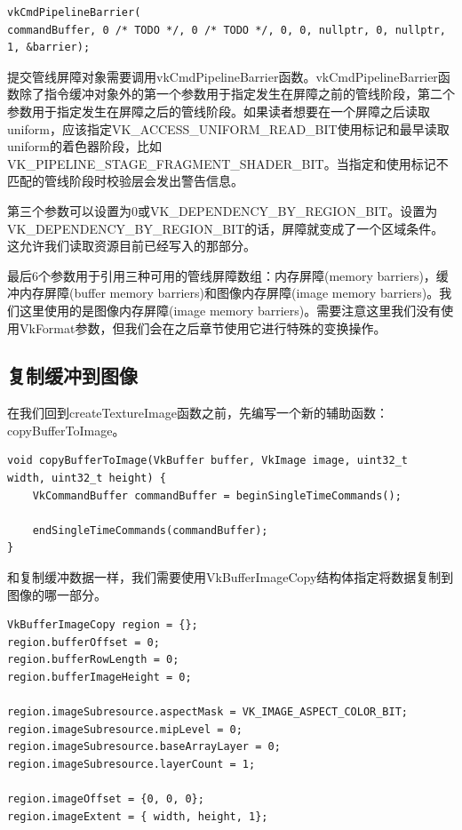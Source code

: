 \documentclass{ctexart}
\begin{document}
\begin{lstlisting}[language={[ANSI]C}]
vkCmdPipelineBarrier(
commandBuffer, 0 /* TODO */, 0 /* TODO */, 0, 0, nullptr, 0, nullptr, 1, &barrier);
\end{lstlisting}

提交管线屏障对象需要调用vkCmdPipelineBarrier函数。vkCmdPipelineBarrier函数除了指令缓冲对象外的第一个参数用于指定发生在屏障之前的管线阶段，第二个参数用于指定发生在屏障之后的管线阶段。如果读者想要在一个屏障之后读取uniform，应该指定VK\_ACCESS\_UNIFORM\_READ\_BIT使用标记和最早读取uniform的着色器阶段，比如VK\_PIPELINE\_STAGE\_FRAGMENT\_SHADER\_BIT。当指定和使用标记不匹配的管线阶段时校验层会发出警告信息。

第三个参数可以设置为0或VK\_DEPENDENCY\_BY\_REGION\_BIT。设置为VK\_DEPENDENCY\_BY\_REGION\_BIT的话，屏障就变成了一个区域条件。这允许我们读取资源目前已经写入的那部分。

最后6个参数用于引用三种可用的管线屏障数组：内存屏障(memory barriers)，缓冲内存屏障(buffer memory barriers)和图像内存屏障(image memory barriers)。我们这里使用的是图像内存屏障(image memory barriers)。需要注意这里我们没有使用VkFormat参数，但我们会在之后章节使用它进行特殊的变换操作。

\subsection{复制缓冲到图像}

在我们回到createTextureImage函数之前，先编写一个新的辅助函数：copyBufferToImage。

\begin{lstlisting}[language={[ANSI]C}]
void copyBufferToImage(VkBuffer buffer, VkImage image, uint32_t
width, uint32_t height) {
	VkCommandBuffer commandBuffer = beginSingleTimeCommands();

	endSingleTimeCommands(commandBuffer);
}
\end{lstlisting}

和复制缓冲数据一样，我们需要使用VkBufferImageCopy结构体指定将数据复制到图像的哪一部分。

\begin{lstlisting}[language={[ANSI]C}]
VkBufferImageCopy region = {};
region.bufferOffset = 0;
region.bufferRowLength = 0;
region.bufferImageHeight = 0;

region.imageSubresource.aspectMask = VK_IMAGE_ASPECT_COLOR_BIT;
region.imageSubresource.mipLevel = 0;
region.imageSubresource.baseArrayLayer = 0;
region.imageSubresource.layerCount = 1;

region.imageOffset = {0, 0, 0};
region.imageExtent = { width, height, 1};
\end{lstlisting}
\end{document}
